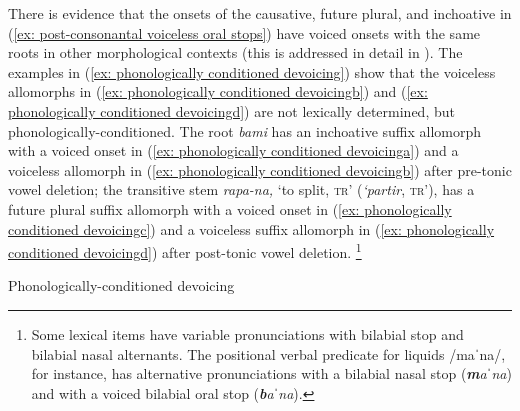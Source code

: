 There is evidence that the onsets of the causative, future plural, and inchoative in (\ref{ex: post-consonantal voiceless oral stops}) have voiced onsets with the same roots in other morphological contexts (this is addressed in detail in ). The examples in (\ref{ex: phonologically conditioned devoicing}) show that the voiceless allomorphs in (\ref{ex: phonologically conditioned devoicingb}) and (\ref{ex: phonologically conditioned devoicingd}) are not lexically determined, but phonologically-conditioned. The root \textit{bami} has an inchoative suffix allomorph with a voiced onset in (\ref{ex: phonologically conditioned devoicinga}) and a voiceless allomorph in (\ref{ex: phonologically conditioned devoicingb}) after pre-tonic vowel deletion; the transitive stem \textit{rapa-na,} ‘to split, \textsc{tr}’ (\textit{‘partir}, \textsc{tr}’), has a future plural suffix allomorph with a voiced onset in (\ref{ex: phonologically conditioned devoicingc}) and a voiceless suffix allomorph in (\ref{ex: phonologically conditioned devoicingd}) after post-tonic vowel deletion. \footnote{Some lexical items have variable pronunciations with bilabial stop and bilabial nasal alternants. The positional verbal predicate for liquids /maˈna/, for instance, has alternative pronunciations with a bilabial nasal stop (\textbf{\textit{m}}\textit{aˈna}) and with a voiced bilabial oral stop (\textbf{\textit{b}}\textit{aˈna}).}

\ea\label{ex: phonologically conditioned devoicing}
{Phonologically-conditioned devoicing}

